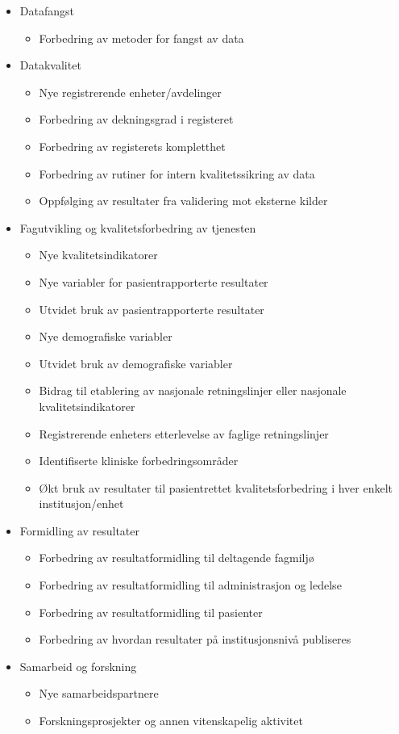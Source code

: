 \documentclass[norsk, a4paper, twocolumn]{report}
\begin{document}
\begin{itemize}
  \item Datafangst
    \begin{itemize}
      \item Forbedring av metoder for fangst av data
    \end{itemize}
  \item Datakvalitet
    \begin{itemize}
      \item Nye registrerende enheter/avdelinger
      \item Forbedring av dekningsgrad i registeret
      \item Forbedring av registerets kompletthet
      \item Forbedring av rutiner for intern kvalitetssikring av data
      \item Oppfølging av resultater fra validering mot eksterne kilder
    \end{itemize}
  \item Fagutvikling og kvalitetsforbedring av tjenesten
    \begin{itemize}
      \item Nye kvalitetsindikatorer
      \item Nye variabler for pasientrapporterte resultater
      \item Utvidet bruk av pasientrapporterte resultater
      \item Nye demografiske variabler
      \item Utvidet bruk av demografiske variabler
      \item Bidrag til etablering av nasjonale retningslinjer eller 
        nasjonale kvalitetsindikatorer
      \item Registrerende enheters etterlevelse av faglige retningslinjer
      \item Identifiserte kliniske forbedringsområder
      \item Økt bruk av resultater til pasientrettet kvalitetsforbedring i hver
        enkelt institusjon/enhet
    \end{itemize}
  \item Formidling av resultater
    \begin{itemize}
      \item Forbedring av resultatformidling til deltagende fagmiljø
      \item Forbedring av resultatformidling til administrasjon og ledelse
      \item Forbedring av resultatformidling til pasienter
      \item Forbedring av hvordan resultater på institusjonsnivå
        publiseres
    \end{itemize}
  \item Samarbeid og forskning
    \begin{itemize}
      \item Nye samarbeidspartnere
      \item Forskningsprosjekter og annen vitenskapelig aktivitet
    \end{itemize}
\end{itemize}
\end{document}
